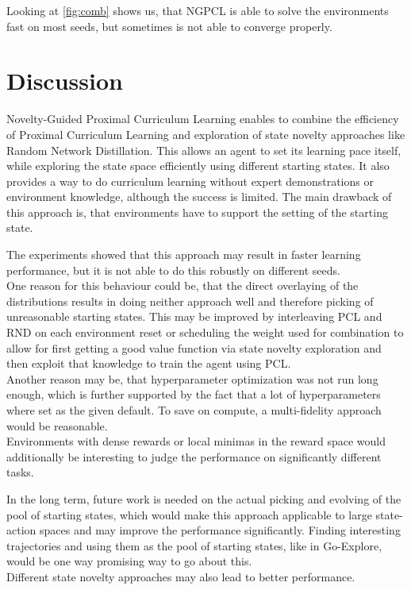 \documentclass{article}
\begin{document}
Looking at \cref{fig:comb} shows us, that NGPCL is able to solve the environments fast on most seeds, but sometimes is not able to converge properly.


\section{Discussion}
Novelty-Guided Proximal Curriculum Learning enables to combine the efficiency of Proximal Curriculum Learning and exploration of state novelty approaches like Random Network Distillation. This allows an agent to set its learning pace itself, while exploring the state space efficiently using different starting states. It also provides a way to do curriculum learning without expert demonstrations or environment knowledge, although the success is limited. The main drawback of this approach is, that environments have to support the setting of the starting state.

The experiments showed that this approach may result in faster learning performance, but it is not able to do this robustly on different seeds. \\
One reason for this behaviour could be, that the direct overlaying of the distributions results in doing neither approach well and therefore picking of unreasonable starting states. This may be improved by interleaving PCL and RND on each environment reset or scheduling the weight used for combination to allow for first getting a good value function via state novelty exploration and then exploit that knowledge to train the agent using PCL. \\
Another reason may be, that hyperparameter optimization was not run long enough, which is further supported by the fact that a lot of hyperparameters where set as the given default. To save on compute, a multi-fidelity approach would be reasonable. \\
Environments with dense rewards or local minimas in the reward space would additionally be interesting to judge the performance on significantly different tasks.

In the long term, future work is needed on the actual picking and evolving of the pool of starting states, which would make this approach applicable to large state-action spaces and may improve the performance significantly. Finding interesting trajectories and using them as the pool of starting states, like in Go-Explore, would be one way promising way to go about this. \\
Different state novelty approaches may also lead to better performance.
\end{document}
